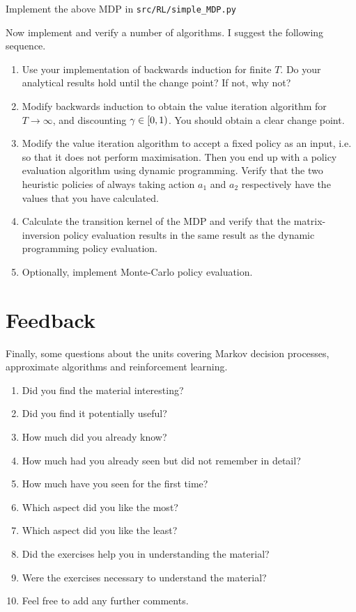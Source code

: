 \documentclass[twoside,a4paper]{article}
\begin{document}
\begin{exercise}[60-120]
  Implement the above MDP in \verb|src/RL/simple_MDP.py|
  
  Now implement and verify a number of algorithms. I suggest the following sequence.
  \begin{enumerate}
  \item Use your implementation of backwards induction for finite $T$. Do your analytical results hold until the change point? If not, why not?
  \item Modify backwards induction to obtain the value iteration algorithm for $T \to \infty$, and discounting $\gamma \in [0, 1)$. You should obtain a clear change point.
  \item Modify the value iteration algorithm to accept a fixed policy as an input, i.e. so that it does not perform maximisation. Then you end up with a policy evaluation algorithm using dynamic programming. Verify that the two heuristic policies of always taking action $a_1$ and $a_2$ respectively have the values that you have calculated.
  \item Calculate the transition kernel of the MDP and verify that the matrix-inversion policy evaluation results in the same result as the dynamic programming policy evaluation.
  \item Optionally, implement Monte-Carlo policy evaluation.
  \end{enumerate}
  \label{exercise:simple-mdp-implementation}
\end{exercise}


\section{Feedback}


\begin{exercise}
  Finally, some questions about the units covering Markov decision processes,  approximate algorithms and reinforcement learning.
  \begin{enumerate}
  \item Did you find the material interesting?
  \item Did you find it potentially useful?
  \item How much did you already know?
  \item How much had you already seen but did not remember in detail?
  \item How much have you seen for the first time?
  \item Which aspect did you like the most?
  \item Which aspect did you like the least?
  \item Did the exercises help you in understanding the material?
  \item Were the exercises necessary to understand the material?
  \item Feel free to add any further comments.
  \end{enumerate}
\end{exercise}
\end{document}
